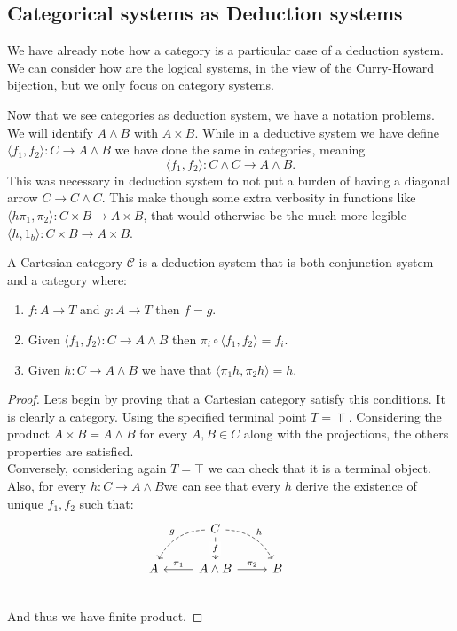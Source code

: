 \subsection{Categorical systems as Deduction systems}

We have already note how a category is a particular case of a deduction system. We can consider how are the logical systems, in the view of the Curry-Howard bijection, but we only focus on category systems.

\begin{remark}Now that  we see categories as deduction system, we have a notation problems. We will identify $A\land B$ with $A\times B$. While in a deductive system we have define $\langle f_1,f_2\rangle : C \to A\land B$ we have done the same in categories, meaning $$\langle f_1,f_2\rangle : C \land C \to A \land B.$$  This was necessary in deduction system to not put a burden of having a diagonal arrow $C\to C\land C$. This make though some extra verbosity in functions like $\langle h\pi_1, \pi_2\rangle : C\times B \to A\times B$, that would otherwise be the much more legible $\langle h, 1_b\rangle: C\times B \to A \times B$. 
\end{remark}


\begin{proposition}\label{prop:CartCategory2}
  A Cartesian category $\mathcal{C}$ is a deduction system that is both conjunction system and a category where:
  \begin{enumerate}
  \item $f:A\to T$ and $g:A\to T$ then $f=g$.
  \item Given $\langle f_1,f_2\rangle: C\to A\land B$ then $\pi_i \circ \langle f_1,f_2\rangle = f_i$.
  \item Given $h:C\to A\land B$ we have that $\langle \pi_1 h, \pi_2 h\rangle = h$.
  \end{enumerate}
\end{proposition}

\begin{proof}

  Lets begin by proving that a Cartesian category satisfy this conditions. It is clearly a category. Using the specified terminal point $T=\Top$.  Considering the product $A\times B = A\land B$ for every $A,B \in C$ along with the projections, the others properties are satisfied.\\

  Conversely, considering again $T= \top$ we can check that it is a terminal object. Also, for every $h:C\to A\land B$we can see that every $h$ derive the existence of unique $f_1,f_2$ such that:
  \[
    \begin{tikzcd}
      {} & C \arrow[bend right,swap,dashed]{dl}{g}
      \arrow[bend left,dashed]{dr}{h} \arrow{d}[description]{f}& & \\
      A  &A\land B \arrow{l}[swap]{\pi_1} \arrow{r}{\pi_2} & 
      B \\
    \end{tikzcd}
  \]
  And thus we have finite product.
\end{proof}

